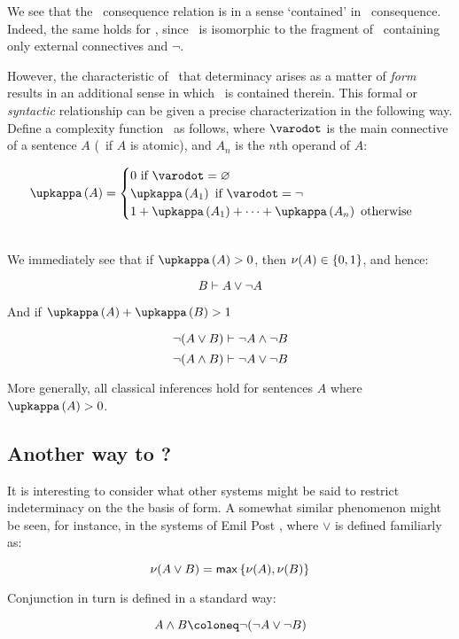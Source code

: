 \noindent We see that the \CPL\ consequence relation is in a sense `contained' in \GO\ consequence. Indeed, the same holds for \BthreeE, since \GO\ is isomorphic to the fragment of \BthreeE\ containing only external connectives and $\neg$.

However, the characteristic of \GO\ that determinacy arises as a matter of \emph{form} results in an additional sense in which \CPL\ is contained therein. This formal or \emph{syntactic} relationship can be given a precise characterization in the following way. Define a complexity function \Complexity\ as follows, where $\varodot$ is the main connective of a sentence $A$ (\Empty\ if $A$ is atomic), and $A_n$ is the $n$th operand of $A$:
\begin{singlespace}
\[ \Cpx{A} = \begin{cases}
						0 \mbox{ if } \varodot = \Empty\\
						\Cpx{A_1} \mbox{ if } \varodot = \neg\\
						1+\Cpx{A_1}+\dots+\Cpx{A_n} \mbox{ otherwise }
						\end{cases}
						\]
\end{singlespace}
\ \\
\noindent We immediately see that if $\Cpx{A} > 0$, then $\mathcal{\nu}({A}) \in \left\{{0,1}\right\}$, and hence:

\[ {B}\vdash{A\vee \neg A} \]

\noindent And if $\Cpx{A}+\Cpx{B}>1$

\[ {\neg (A \vee B)}\vdash{\neg A \wedge \neg B} \]
\[ {\neg (A \wedge B)}\vdash{\neg A \vee \neg B} \]

\noindent More generally, all classical inferences hold for sentences $A$ where $\Cpx{A}>0$. 


\subsection{Another way to \GO?}\label{post}
It is interesting to consider what other systems might be said to restrict indeterminacy on the the basis of form. A somewhat similar phenomenon might be seen, for instance, in the systems of Emil Post \citeyear{Post1921}, where $\vee$ is defined familiarly as:

\[\mathcal{\nu}({A \vee B}) = \mathsf{max}\left\{{\mathcal{\nu}({A}),\mathcal{\nu}({B})}\right\} \]

\noindent Conjunction in turn is defined in a standard way:

\[A\wedge B \Defined \neg(\neg A \vee \neg B) \]

